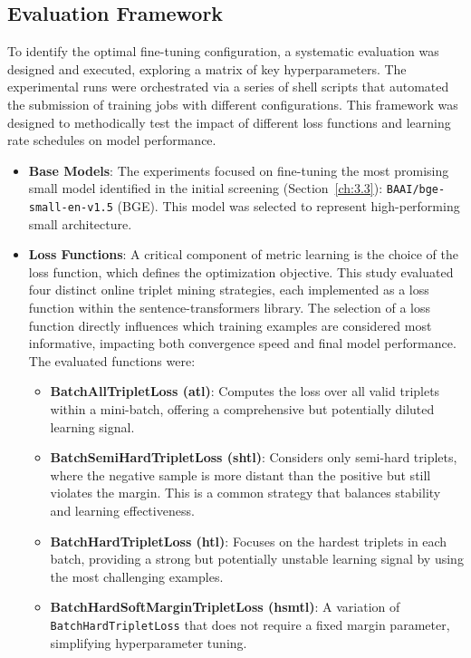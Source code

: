 \subsection{Evaluation Framework}
To identify the optimal fine-tuning configuration, a systematic evaluation was designed and executed, exploring a matrix of key hyperparameters. The experimental runs were orchestrated via a series of shell scripts that automated the submission of training jobs with different configurations. This framework was designed to methodically test the impact of different loss functions and learning rate schedules on model performance.  
\begin{itemize}
    \item \textbf{Base Models}: The experiments focused on fine-tuning the most promising small model identified in the initial screening (Section~\ref{ch:3.3}): \verb|BAAI/bge-small-en-v1.5| (BGE). This model was selected to represent high-performing small architecture.
    \item \textbf{Loss Functions}: A critical component of metric learning is the choice of the loss function, which defines the optimization objective. This study evaluated four distinct online triplet mining strategies, each implemented as a loss function within the sentence-transformers library. The selection of a loss function directly influences which training examples are considered most informative, impacting both convergence speed and final model performance. The evaluated functions were:  
    \begin{itemize}
        \item \textbf{BatchAllTripletLoss (atl)}: Computes the loss over all valid triplets within a mini-batch, offering a comprehensive but potentially diluted learning signal.
        \item \textbf{BatchSemiHardTripletLoss (shtl)}: Considers only semi-hard triplets, where the negative sample is more distant than the positive but still violates the margin. This is a common strategy that balances stability and learning effectiveness.
        \item \textbf{BatchHardTripletLoss (htl)}: Focuses on the hardest triplets in each batch, providing a strong but potentially unstable learning signal by using the most challenging examples.  
        \item \textbf{BatchHardSoftMarginTripletLoss (hsmtl)}: A variation of \verb|BatchHardTripletLoss| that does not require a fixed margin parameter, simplifying hyperparameter tuning.
    \end{itemize}

\end{itemize}
